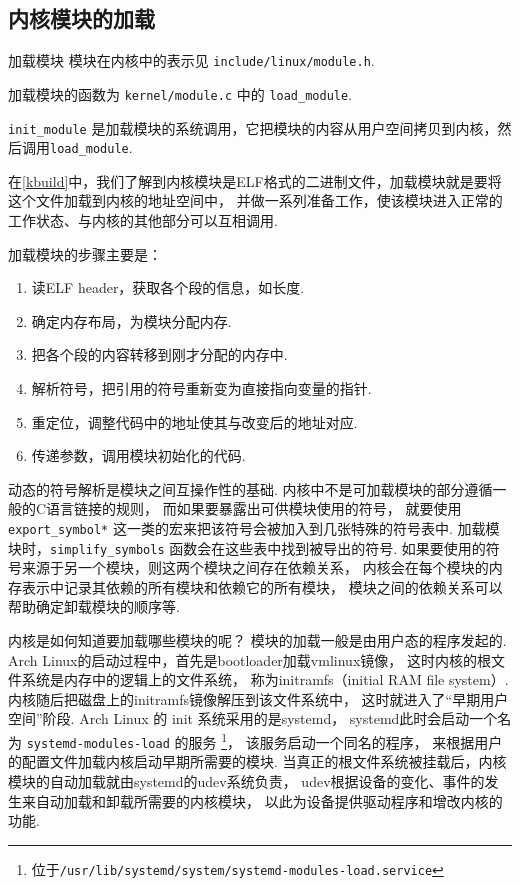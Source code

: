 \subsection{内核模块的加载}

\begin{readsrcbox}{加载模块}
	模块在内核中的表示见 \lstinline{include/linux/module.h}.

	加载模块的函数为 \lstinline{kernel/module.c} 中的 \lstinline{load_module}.

	\lstinline{init_module} 是加载模块的系统调用，它把模块的内容从用户空间拷贝到内核，然后调用\lstinline{load_module}.
\end{readsrcbox}

在\ref{kbuild}中，我们了解到内核模块是ELF格式的二进制文件，加载模块就是要将这个文件加载到内核的地址空间中，
并做一系列准备工作，使该模块进入正常的工作状态、与内核的其他部分可以互相调用.

加载模块的步骤主要是：
\begin{enumerate}
	\item 读ELF header，获取各个段的信息，如长度.
	\item 确定内存布局，为模块分配内存.
	\item 把各个段的内容转移到刚才分配的内存中.
	\item 解析符号，把引用的符号重新变为直接指向变量的指针.
	\item 重定位，调整代码中的地址使其与改变后的地址对应.
	\item 传递参数，调用模块初始化的代码.
\end{enumerate}

动态的符号解析是模块之间互操作性的基础.
内核中不是可加载模块的部分遵循一般的C语言链接的规则，
而如果要暴露出可供模块使用的符号，
就要使用 \lstinline{export_symbol*} 这一类的宏来把该符号会被加入到几张特殊的符号表中. \cite{Unreliab5:online}
加载模块时，\lstinline{simplify_symbols} 函数会在这些表中找到被导出的符号.
如果要使用的符号来源于另一个模块，则这两个模块之间存在依赖关系，
内核会在每个模块的内存表示中记录其依赖的所有模块和依赖它的所有模块，
模块之间的依赖关系可以帮助确定卸载模块的顺序等.

内核是如何知道要加载哪些模块的呢？
模块的加载一般是由用户态的程序发起的.
Arch Linux的启动过程\cite{archboot:online}中，首先是bootloader加载vmlinux镜像，
这时内核的根文件系统是内存中的逻辑上的文件系统，
称为initramfs（initial RAM file system）.
内核随后把磁盘上的initramfs镜像解压到该文件系统中，
这时就进入了“早期用户空间”阶段.
Arch Linux 的 init 系统采用的是systemd，
systemd此时会启动一个名为 \lstinline{systemd-modules-load} 的服务
\footnote{位于\lstinline{/usr/lib/systemd/system/systemd-modules-load.service}}，
该服务启动一个同名的程序，
来根据用户的配置文件加载内核启动早期所需要的模块.
当真正的根文件系统被挂载后，内核模块的自动加载就由systemd的udev系统负责，
udev根据设备的变化、事件的发生来自动加载和卸载所需要的内核模块，
以此为设备提供驱动程序和增改内核的功能.

